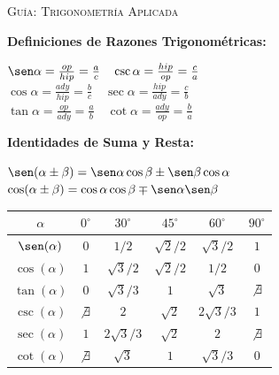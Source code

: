 \documentclass[letterpaper, 12pt]{article}
\begin{document}
\begin{center}
    \color{azulFuerte} {\huge \scshape Guía: Trigonometría Aplicada}
\end{center}

\noindent
\begin{minipage}[t]{0.48\textwidth}
    \small \textbf{Definiciones de Razones Trigonométricas:}
    \begin{formulabox}
        $\sen \alpha = \frac{op}{hip} = \frac{a}{c} \quad \csc \alpha = \frac{hip}{op} = \frac{c}{a}$ \\[4pt]
        $\cos \alpha = \frac{ady}{hip} = \frac{b}{c} \quad \sec \alpha = \frac{hip}{ady} = \frac{c}{b}$ \\[4pt]
        $\tan \alpha = \frac{op}{ady} = \frac{a}{b} \quad \cot \alpha = \frac{ady}{op} = \frac{b}{a}$
    \end{formulabox}
\end{minipage}
\hfill
\begin{minipage}[t]{0.48\textwidth}
    \small \textbf{Identidades de Suma y Resta:}
    \begin{formulabox}
        $\sen(\alpha \pm \beta) = \sen\alpha \cos\beta \pm \sen\beta \cos\alpha$ \\[4pt]
        $\cos(\alpha \pm \beta) = \cos\alpha \cos\beta \mp \sen\alpha \sen\beta$
    \end{formulabox}
\end{minipage}

\vspace{0.2cm}

\begin{center}
    \small
    \renewcommand{\arraystretch}{1.2}
    \begin{tabular}{|c|c|c|c|c|c|}
    \hline
    \rowcolor{azulFuerte} \color{white} $\alpha$ & \color{white} $0^\circ$ & \color{white} $30^\circ$ & \color{white} $45^\circ$ & \color{white} $60^\circ$ & \color{white} $90^\circ$ \\ \hline
    $\sen(\alpha)$ & $0$ & $1/2$ & $\sqrt{2}/2$ & $\sqrt{3}/2$ & $1$ \\ \hline
    $\cos(\alpha)$ & $1$ & $\sqrt{3}/2$ & $\sqrt{2}/2$ & $1/2$ & $0$ \\ \hline
    $\tan(\alpha)$ & $0$ & $\sqrt{3}/3$ & $1$ & $\sqrt{3}$ & $\not\exists$ \\ \hline
    $\csc(\alpha)$ & $\not\exists$ & $2$ & $\sqrt{2}$ & $2\sqrt{3}/3$ & $1$ \\ \hline
    $\sec(\alpha)$ & $1$ & $2\sqrt{3}/3$ & $\sqrt{2}$ & $2$ & $\not\exists$ \\ \hline
    $\cot(\alpha)$ & $\not\exists$ & $\sqrt{3}$ & $1$ & $\sqrt{3}/3$ & $0$ \\ \hline
    \end{tabular}
\end{center}
\end{document}
